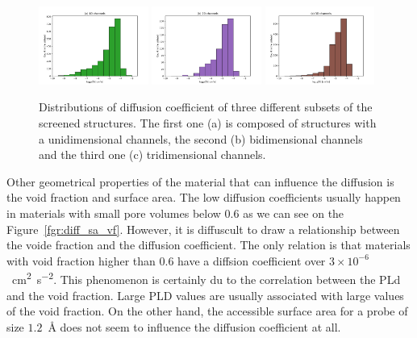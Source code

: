 \documentclass[main]{subfiles}
\begin{document}
\begin{figure}[ht]
  \centering
    \includegraphics[width=0.32\textwidth]{figures/5-diffusion/histogram_chan1D.pdf}
    \includegraphics[width=0.32\textwidth]{figures/5-diffusion/histogram_chan2D.pdf}
    \includegraphics[width=0.32\textwidth]{figures/5-diffusion/histogram_chan3D.pdf}
    \caption{ Distributions of diffusion coefficient of three different subsets of the screened structures. The first one (a) is composed of structures with a unidimensional channels, the second (b) bidimensional channels and the third one (c) tridimensional channels. }\label{fgr:hist_diffusion_chandim}
\end{figure}

Other geometrical properties of the material that can influence the diffusion is the void fraction and surface area. The low diffusion coefficients usually happen in materials with small pore volumes below $0.6$ as we can see on the Figure~\ref{fgr:diff_sa_vf}. However, it is diffuscult to draw a relationship between the voide fraction and the diffusion coefficient. The only relation is that materials with void fraction higher than $0.6$ have a diffsion coefficient over $3\times 10^{-6}$~\si{\square\cm\per\square\s}. This phenomenon is certainly du to the correlation between the PLd and the void fraction. Large PLD values are usually associated with large values of the void fraction. On the other hand, the accessible surface area for a probe of size $1.2$~\si{\angstrom} does not seem to influence the diffusion coefficient at all. 
\end{document}

